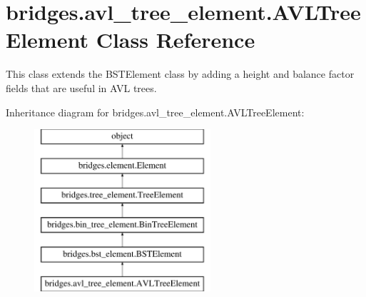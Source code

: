 \hypertarget{classbridges_1_1avl__tree__element_1_1_a_v_l_tree_element}{}\section{bridges.\+avl\+\_\+tree\+\_\+element.\+A\+V\+L\+Tree\+Element Class Reference}
\label{classbridges_1_1avl__tree__element_1_1_a_v_l_tree_element}


This class extends the B\+S\+T\+Element class by adding a height and balance factor fields that are useful in A\+V\+L trees.  


Inheritance diagram for bridges.\+avl\+\_\+tree\+\_\+element.\+A\+V\+L\+Tree\+Element\+:\begin{figure}[H]
\begin{center}
\leavevmode
\includegraphics[height=6.000000cm]{classbridges_1_1avl__tree__element_1_1_a_v_l_tree_element}
\end{center}
\end{figure}
